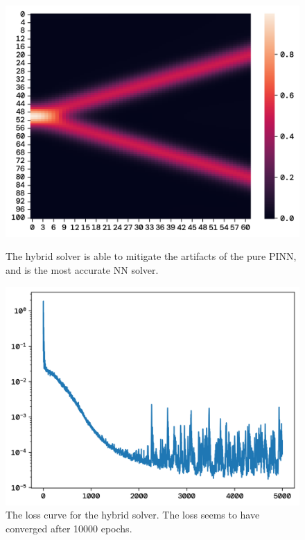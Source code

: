 \documentclass[twoside,11pt]{report}
\begin{document}
    \begin{figure}[!ht]
        \begin{minipage}[t]{0.5\textwidth - 1mm}
            \begin{center}
                \includegraphics[width=\textwidth]{../runsAndFigures/wave_tf_hybrid.png}
            \end{center}
            \caption
            {
                The hybrid solver is able to mitigate the artifacts of the pure PINN, and is the most accurate NN solver.
            }\label{fig:wave_own_dnn}
        \end{minipage}
        \hspace{2mm}
        \begin{minipage}[t]{0.5\textwidth - 1mm}
            \begin{center}
                \includegraphics[width=\textwidth]{../runsAndFigures/wave_tf_hybrid_loss.png}
            \end{center}
            \caption
            {
                The loss curve for the hybrid solver. The loss seems to have converged after 10000 epochs.
            }\label{fig:wave_tf_dnn}
        \end{minipage}
    \end{figure}
\end{document}
